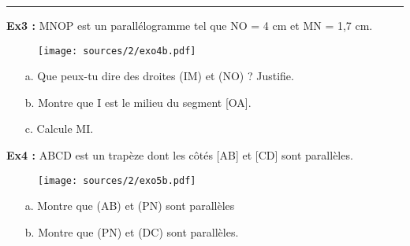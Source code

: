 \documentclass[11pt]{article}
\newcommand{\horrule}[1]{\rule{\linewidth}{#1}} %
\newcommand{\Pointille}[1][3]{\multido{}{#1}{ \makebox[\linewidth]{\dotfill}\\[\parskip]}}
\begin{document}
\horrule{1px}
\setlength{\columnseprule}{1pt}
\begin{multicols}{2}


\textbf{Ex3 :} MNOP est un parallélogramme tel que NO = 4 cm et MN = 1,7 cm.
  \begin{figure}[H]
    \centering
    \texttt{[image: sources/2/exo4b.pdf]}
  \end{figure}
  \begin{itemize}
  \item[a.] Que peux-tu dire des droites (IM) et (NO) ? Justifie. \newline
    \Pointille[3]
  \item[b.] Montre que I est le milieu du segment [OA]. \newline
    \Pointille[5]
  \item[c.] Calcule MI. \newline
    \Pointille[2] 
  \end{itemize}



\textbf{Ex4 :} ABCD est un trapèze dont les côtés [AB] et [CD] sont parallèles.
  \begin{figure}[H]
    \centering
    \texttt{[image: sources/2/exo5b.pdf]}
  \end{figure}
  \begin{itemize}
  \item[a.] Montre que (AB) et (PN) sont parallèles \newline
    \Pointille[7]
  \item[b.] Montre que (PN) et (DC) sont parallèles. \newline
    \Pointille[7]
  \end{itemize}

\end{multicols}
\end{document}
